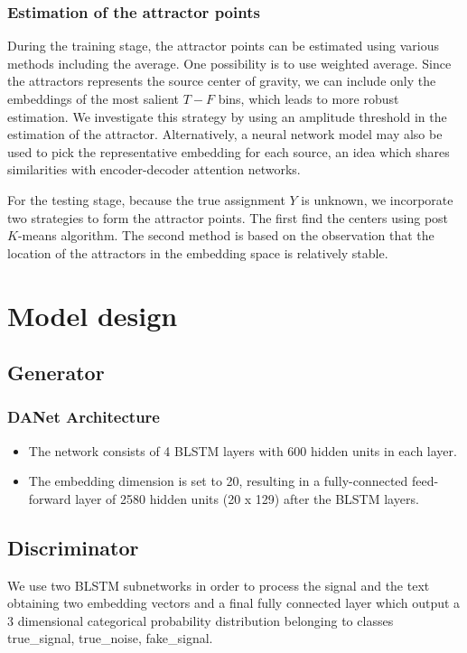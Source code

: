 \documentclass{article}
\begin{document}
\subsubsection{Estimation of the attractor points}
During the training stage, the attractor points can be estimated using various methods including the average. One possibility is to use weighted average. Since the attractors represents the source center of gravity, we can include only the embeddings of the most salient $T-F$ bins, which leads to more robust estimation. We investigate this strategy by using an amplitude threshold in the estimation of the attractor. 
Alternatively, a neural network model may also be used to pick the representative embedding for each source, an idea which shares similarities with encoder-decoder attention networks.

For the testing stage, because the true assignment $Y$ is unknown, we incorporate two strategies to form the attractor points. The first find the centers using post $K$-means algorithm. The second method is based on the observation that the location of the attractors in the embedding space is relatively stable.


\section{Model design}

\subsection{Generator}
\subsubsection{DANet Architecture}
\begin{itemize}
\item The network consists of 4  BLSTM layers with 600 hidden units in each layer.
\item The embedding dimension is set to 20, resulting in a fully-connected feed-forward layer of 2580 hidden units (20 x 129) after the BLSTM layers.
\end{itemize}

\subsection{Discriminator}
We use two BLSTM subnetworks in order to process the signal and the text obtaining two embedding vectors and a final fully connected  layer which output a 3 dimensional categorical probability distribution belonging to classes {true\_signal, true\_noise, fake\_signal}.
\end{document}
